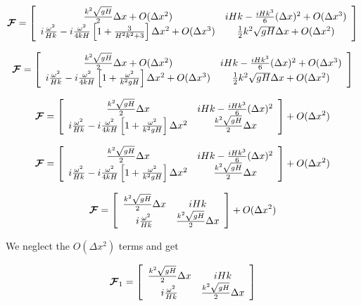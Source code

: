 \documentclass[12pt]{article}
\begin{document}
\[\boldsymbol{\mathcal{F}} = \left[\begin{array}{c c}
\frac{k^2\sqrt{gH} }{ 2}  \Delta x  + O( \Delta x^2) & iHk  - \frac{iHk^3}{6}( \Delta x)^2 +  O( \Delta x^3) \\i \frac{\omega^2}{Hk} -i \frac{\omega^2}{4kH}\left[1 + \frac{3}{H^2k^2 + 3}\right]\Delta x ^2 + O(\Delta x ^3) &  \frac{1}{2}k^2\sqrt{gH} \Delta x + O(\Delta x^2)
\end{array}\right]   \]

\[\boldsymbol{\mathcal{F}} = \left[\begin{array}{c c}
\frac{k^2\sqrt{gH} }{ 2}  \Delta x  + O( \Delta x^2) & iHk  - \frac{iHk^3}{6}( \Delta x)^2 +  O( \Delta x^3) \\i \frac{\omega^2}{Hk} -i \frac{\omega^2}{4kH}\left[1 + \frac{\omega^2}{k^2gH}\right]\Delta x ^2 + O(\Delta x ^3) &  \frac{1}{2}k^2\sqrt{gH} \Delta x + O(\Delta x^2)
\end{array}\right]   \]

\[\boldsymbol{\mathcal{F}} = \left[\begin{array}{c c}
\frac{k^2\sqrt{gH} }{ 2}  \Delta x  & iHk  - \frac{iHk^3}{6}( \Delta x)^2  \\i \frac{\omega^2}{Hk} -i \frac{\omega^2}{4kH}\left[1 + \frac{\omega^2}{k^2gH}\right]\Delta x ^2  &  \frac{k^2\sqrt{gH} }{ 2}  \Delta x 
\end{array}\right] + O(\Delta x^2)  \]

\[\boldsymbol{\mathcal{F}} = \left[\begin{array}{c c}
\frac{k^2\sqrt{gH} }{ 2}  \Delta x  & iHk  - \frac{iHk^3}{6}( \Delta x)^2  \\i \frac{\omega^2}{Hk} -i \frac{\omega^2}{4kH}\left[1 + \frac{\omega^2}{k^2gH}\right]\Delta x ^2  &  \frac{k^2\sqrt{gH} }{ 2}  \Delta x 
\end{array}\right] + O(\Delta x^2)  \]

\[\boldsymbol{\mathcal{F}} = \left[\begin{array}{c c}
\frac{k^2\sqrt{gH} }{ 2}  \Delta x  & iHk \\i \frac{\omega^2}{Hk}  &  \frac{k^2\sqrt{gH} }{ 2}  \Delta x 
\end{array}\right] + O(\Delta x^2)  \]

We neglect the $O(\Delta x^2)$ terms and get

\[\boldsymbol{\mathcal{F}}_1 = \left[\begin{array}{c c}
\frac{k^2\sqrt{gH} }{ 2}  \Delta x  & iHk \\i \frac{\omega^2}{Hk}  &  \frac{k^2\sqrt{gH} }{ 2}  \Delta x 
\end{array}\right]  \]
\end{document}
